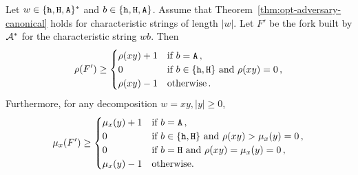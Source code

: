 \begin{proposition}\label{prop:mu-lowerbound}
  Let $w \in \{\mathtt{h}, \mathtt{H}, \mathtt{A}\}^*$ 
  and $b \in \{\mathtt{h}, \mathtt{H}, \mathtt{A}\}$. 
  Assume that Theorem~\ref{thm:opt-adversary-canonical} 
  holds for characteristic strings of length $|w|$.
  Let $F'$ be the fork built by $\mathcal{A}^*$ 
  for the characteristic string $wb$. 
  Then 
  \begin{equation}
    \rho(F') \geq \begin{cases}
     \rho(xy) + 1 & \text{if $b = \mathtt{A}$} \,, \\
     0 & \text{if $b \in \{\mathtt{h}, \mathtt{H}\}$ and $\rho(xy) = 0$}\,, \\
     \rho(xy) - 1 & \text{otherwise}\,.
    \end{cases}
    \label{eq:rho-lowerbound}    
  \end{equation}
  Furthermore, for any decomposition $w = xy, |y| \geq 0$, 
  \begin{equation}
    \mu_x(F') \geq \begin{cases}
      \mu_x(y) + 1 & \text{if $b = \mathtt{A}$}\,, \\
      0 & \text{if $b \in \{\mathtt{h}, \mathtt{H}\}$ and $\rho(xy) > \mu_x(y)=0$}\,, \\
      0 & \text{if $b = \mathtt{H}$ and $\rho(xy) = \mu_x(y) = 0$}\,, \\
      \mu_x(y)-1 & \text{otherwise.}
    \end{cases}
    \label{eq:mu-lowerbound}
  \end{equation}
  
\end{proposition}
